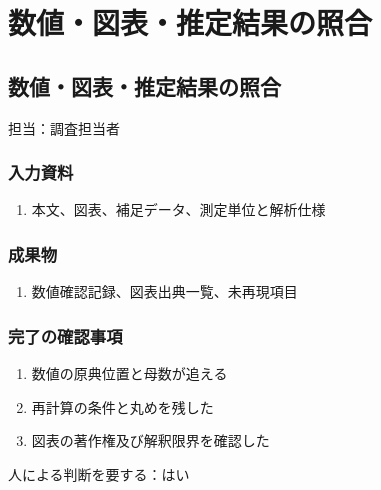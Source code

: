 \documentclass[a4paper,11pt]{article}
\begin{document}
\section{数値・図表・推定結果の照合}
\subsection{数値・図表・推定結果の照合}
\par 担当：調査担当者\par\medskip
\subsubsection*{入力資料}
\begin{enumerate}[leftmargin=2em,itemsep=0.35em]
\item 本文、図表、補足データ、測定単位と解析仕様
\end{enumerate}
\subsubsection*{成果物}
\begin{enumerate}[leftmargin=2em,itemsep=0.35em]
\item 数値確認記録、図表出典一覧、未再現項目
\end{enumerate}
\subsubsection*{完了の確認事項}
\begin{enumerate}[leftmargin=2em,itemsep=0.35em]
\item 数値の原典位置と母数が追える
\item 再計算の条件と丸めを残した
\item 図表の著作権及び解釈限界を確認した
\end{enumerate}
\par 人による判断を要する：はい\par\medskip
\end{document}
